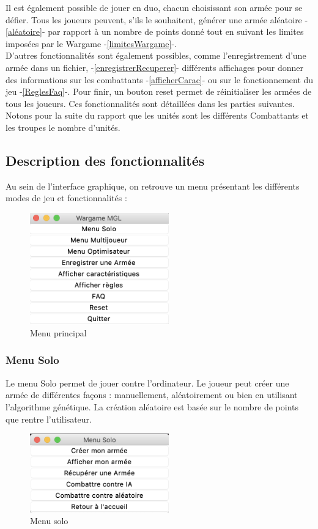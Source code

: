 \documentclass[a4paper]{article} %
\begin{document}
Il est également possible de jouer en duo, chacun choisissant son armée pour se défier. Tous les joueurs peuvent, s'ils le souhaitent, générer une armée aléatoire -\ref{aléatoire}- par rapport à un nombre de points donné tout en suivant les limites imposées par le Wargame -\ref{limitesWargame}-.\\

D'autres fonctionnalités sont également possibles, comme l'enregistrement d'une armée dans un fichier, -\ref{enregistrerRecuperer}- différents affichages pour donner des informations sur les combattants -\ref{afficherCarac}- ou sur le fonctionnement du jeu -\ref{ReglesFaq}-. Pour finir, un bouton reset permet de réinitialiser les armées de tous les joueurs. Ces fonctionnalités sont détaillées dans les parties suivantes. Notons pour la suite du rapport que les unités sont les différents Combattants et les troupes le nombre d'unités.

	\subsection{Description des fonctionnalités}
Au sein de l'interface graphique, on retrouve un menu présentant les différents modes de jeu et fonctionnalités :
\begin{figure}[!h]
	\begin{center}
	\includegraphics[width=6cm]{Images/interface.png}
	\caption{Menu principal\label{fig:MenuPrincipal}}
	\end{center}
\end{figure}

		\subsubsection{Menu Solo}
Le menu Solo permet de jouer contre l'ordinateur.
Le joueur peut créer une armée de différentes façons : manuellement, aléatoirement ou bien en utilisant l'algorithme génétique. La création aléatoire est basée sur le nombre de points que rentre l'utilisateur.
\begin{figure}[!h]
	\begin{center}
	\includegraphics[width=6cm]{Images/menu1joueur.png}
	\caption{Menu solo\label{fig:MenuSolo}}
	\end{center}
\end{figure}
\end{document}
